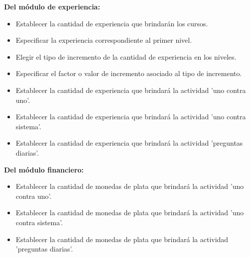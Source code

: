     {\bf Del módulo de experiencia:}
        \begin{itemize}
        \item Establecer la cantidad de experiencia que brindarán los cursos.
        \item Especificar la experiencia correspondiente al primer nivel.
        \item Elegir el tipo de incremento de la cantidad de experiencia en los niveles.
        \item Especificar el factor o valor de incremento asociado al tipo de incremento.
        \item Establecer la cantidad de experiencia que brindará la actividad 'uno contra uno'.
        \item Establecer la cantidad de experiencia que brindará la actividad 'uno contra sistema'.
        \item Establecer la cantidad de experiencia que brindará la actividad 'preguntas diarias'.
        \end{itemize}

    {\bf Del módulo financiero:}
        \begin{itemize}
        \item Establecer la cantidad de monedas de plata que brindará la actividad 'uno contra uno'.
        \item Establecer la cantidad de monedas de plata que brindará la actividad 'uno contra sistema'.
        \item Establecer la cantidad de monedas de plata que brindará la actividad 'preguntas diarias'.
        \end{itemize}



